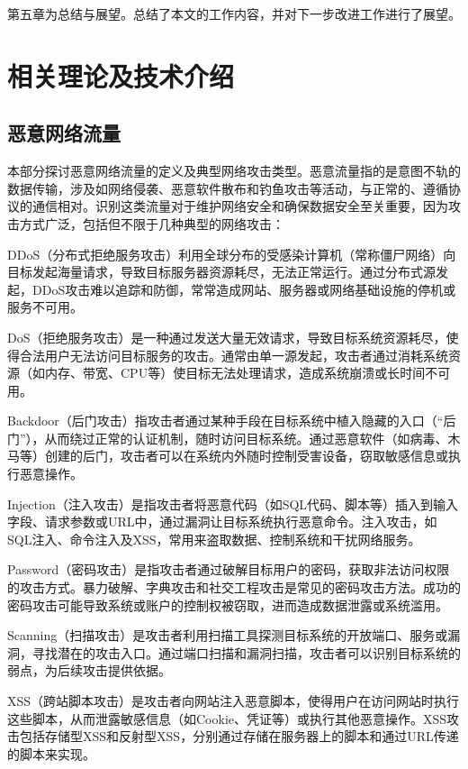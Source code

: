 \documentclass[promaster]{thesis-uestc}
\begin{document}
第五章为总结与展望。总结了本文的工作内容，并对下一步改进工作进行了展望。

\chapter{相关理论及技术介绍}
\section{恶意网络流量}
本部分探讨恶意网络流量的定义及典型网络攻击类型。恶意流量指的是意图不轨的数据传输，涉及如网络侵袭、恶意软件散布和钓鱼攻击等活动，与正常的、遵循协议的通信相对。识别这类流量对于维护网络安全和确保数据安全至关重要，因为攻击方式广泛，包括但不限于几种典型的网络攻击：

DDoS（分布式拒绝服务攻击）利用全球分布的受感染计算机（常称僵尸网络）向目标发起海量请求，导致目标服务器资源耗尽，无法正常运行。通过分布式源发起，DDoS攻击难以追踪和防御，常常造成网站、服务器或网络基础设施的停机或服务不可用。

DoS（拒绝服务攻击）是一种通过发送大量无效请求，导致目标系统资源耗尽，使得合法用户无法访问目标服务的攻击。通常由单一源发起，攻击者通过消耗系统资源（如内存、带宽、CPU等）使目标无法处理请求，造成系统崩溃或长时间不可用。

Backdoor（后门攻击）指攻击者通过某种手段在目标系统中植入隐藏的入口（“后门”），从而绕过正常的认证机制，随时访问目标系统。通过恶意软件（如病毒、木马等）创建的后门，攻击者可以在系统内外随时控制受害设备，窃取敏感信息或执行恶意操作。

Injection（注入攻击）是指攻击者将恶意代码（如SQL代码、脚本等）插入到输入字段、请求参数或URL中，通过漏洞让目标系统执行恶意命令。注入攻击，如SQL注入、命令注入及XSS，常用来盗取数据、控制系统和干扰网络服务。

Password（密码攻击）是指攻击者通过破解目标用户的密码，获取非法访问权限的攻击方式。暴力破解、字典攻击和社交工程攻击是常见的密码攻击方法。成功的密码攻击可能导致系统或账户的控制权被窃取，进而造成数据泄露或系统滥用。

Scanning（扫描攻击）是攻击者利用扫描工具探测目标系统的开放端口、服务或漏洞，寻找潜在的攻击入口。通过端口扫描和漏洞扫描，攻击者可以识别目标系统的弱点，为后续攻击提供依据。

XSS（跨站脚本攻击）是攻击者向网站注入恶意脚本，使得用户在访问网站时执行这些脚本，从而泄露敏感信息（如Cookie、凭证等）或执行其他恶意操作。XSS攻击包括存储型XSS和反射型XSS，分别通过存储在服务器上的脚本和通过URL传递的脚本来实现。
\end{document}
